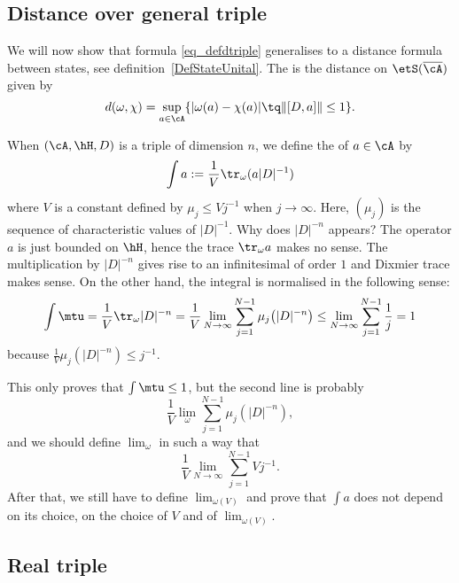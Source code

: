 \subsection{Distance over general triple}

We will now show that formula \eqref{eq_defdtriple} generalises to a distance formula between states, see definition~\ref{DefStateUnital}. The  is the distance on $\etS(\overline{ \cA })$ given by
\begin{equation}
d(\omega,\chi)=\sup_{a\in\cA}\{ | \omega(a)-\chi(a) |\tq \| [D,a] \|\leq 1 \}.
\end{equation}

When $(\cA,\hH,D)$ is a triple of dimension $n$, we define the  of $a\in \cA$ by
\begin{equation}
\int a:=\frac{1}{ V }\tr_{\omega}(a| D |^{-1})
\end{equation}
where $V$ is a constant defined by $\mu_j\leq V j^{-1}$ when $j\to\infty$. Here, $(\mu_j)$ is the sequence of characteristic values of $| D |^{-1}$. Why does $| D |^{-n}$ appears? The operator $a$ is just bounded on $\hH$, hence the trace $\tr_{\omega}a$ makes no sense. The multiplication by $| D |^{-n}$ gives rise to an infinitesimal of order $1$ and Dixmier trace makes sense. On the other hand, the integral is normalised in the following sense:
\[
  \int\mtu=\frac{1}{ V }\tr_{\omega}| D |^{-n}
		=\frac{1}{ V }\lim_{N\to\infty}\sum_{j=1}^{N-1}\mu_j\big( | D |^{-n} \big)
		\leq\lim_{N\to\infty}\sum_{j=1}^{N-1}\frac{1}{ j }
		=1
\]
because $\frac{1}{ V }\mu_j(| D |^{-n})\leq j^{-1}$.

\begin{probleme}
	This only proves that $\int\mtu\leq1$, but the second line is probably
\[
  \frac{1}{ V }\lim_{\omega}\sum_{j=1}^{N-1}\mu_j(| D |^{-n}),
\]
and we should define $\lim_{\omega}$ in such a way that
\[
  \frac{1}{ V }\lim_{N\to\infty}\sum_{j=1}^{N-1}Vj^{-1}.
\]
After that, we still have to define $\lim_{\omega(V)}$ and prove that $\int a$ does not depend on its choice, on the choice of $V$ and of $\lim_{\omega(V)}$.
\end{probleme}

\subsection{Real triple}

